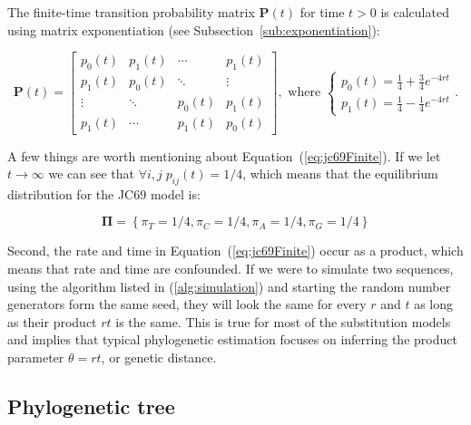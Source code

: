 \noindent
The finite-time transition probability matrix $\mathbf{P}(t)$ for time $t>0$ is calculated using matrix exponentiation  (see Subsection~\ref{sub:exponentiation}):

\begin{equation}
\mathbf{P}\left(t\right)=\left[\begin{array}{cccc}
p_{0}(t) & p_{1}(t) & \cdots & p_{1}(t)\\
p_{1}(t) & p_{0}(t) & \ddots & \vdots\\
\vdots & \ddots & p_{0}(t) & p_{1}(t)\\
p_{1}(t) & \cdots & p_{1}(t) & p_{0}(t)
\end{array}\right],\text{ where }\ensuremath{\begin{cases}
p_{0}(t)=\frac{1}{4}+\frac{3}{4}e^{-4rt}\\
p_{1}(t)=\frac{1}{4}-\frac{1}{4}e^{-4rt}
\end{cases}}.
\label{eq:jc69Finite}
\end{equation}

\noindent
A few things are worth mentioning about Equation~(\ref{eq:jc69Finite}).
If we let $t\rightarrow \infty$ we can see that $\forall i,j\; p_{ij}(t)=1/4$, which means that the equilibrium distribution for the JC69 model is: 

\begin{equation}
\mathbf{\Pi}=\left\{ \pi_{T}=1/4,\pi_{C}=1/4,\pi_{A}=1/4,\pi_{G}=1/4\right\}
\label{eq:jc69Steady}
\end{equation}

\noindent
Second, the rate and time in Equation~(\ref{eq:jc69Finite}) occur as a product, which means that rate and time are confounded.
If we were to simulate two sequences, using the algorithm listed in (\ref{alg:simulation}) and starting the random number generators form the same seed, they will look the same for every $r$ and $t$ as long as their product $rt$ is the same.
This is true for most of the substitution models and implies that typical phylogenetic estimation focuses on inferring the product parameter $\theta=rt$, or genetic distance.

\subsection{Phylogenetic tree}


